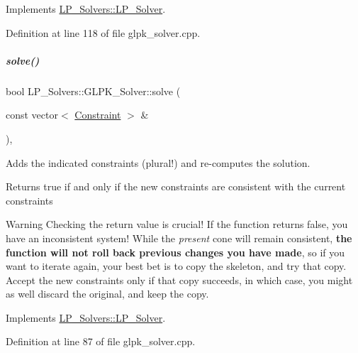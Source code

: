 Implements \hyperlink{group___c_l_s_solvers_a8b9979fb228ac9ccfe037ad6ca48b314}{L\+P\+\_\+\+Solvers\+::\+L\+P\+\_\+\+Solver}.



Definition at line 118 of file glpk\+\_\+solver.\+cpp.

\mbox{\label{group___c_l_s_solvers_a08fcdf86d0fcd8ac3e5da077b627e477}} 
\subparagraph{\texorpdfstring{solve()}{solve()}\hspace{0.1cm}{\footnotesize\ttfamily [2/2]}}
{\footnotesize\ttfamily bool L\+P\+\_\+\+Solvers\+::\+G\+L\+P\+K\+\_\+\+Solver\+::solve (\begin{DoxyParamCaption}\item[{const vector$<$ \hyperlink{group___c_l_s_solvers_class_l_p___solvers_1_1_constraint}{Constraint} $>$ \&}]{ }\end{DoxyParamCaption})\hspace{0.3cm}{\ttfamily [override]}, {\ttfamily [virtual]}}



Adds the indicated constraints (plural!) and re-\/computes the solution. 

\begin{DoxyReturn}{Returns}
{\ttfamily true} if and only if the new constraints are consistent with the current constraints
\end{DoxyReturn}
\begin{DoxyWarning}{Warning}
Checking the return value is crucial! If the function returns {\ttfamily false}, you have an inconsistent system! While the {\itshape present} cone will remain consistent, {\bfseries the function will not roll back previous changes you have made}, so if you want to iterate again, your best bet is to copy the skeleton, and try that copy. Accept the new constraints only if that copy succeeds, in which case, you might as well discard the original, and keep the copy. 
\end{DoxyWarning}


Implements \hyperlink{group___c_l_s_solvers_aea1a5bf98a2c4c06b0550cacdf8b88fd}{L\+P\+\_\+\+Solvers\+::\+L\+P\+\_\+\+Solver}.



Definition at line 87 of file glpk\+\_\+solver.\+cpp.



